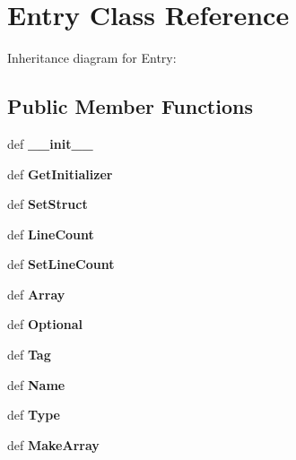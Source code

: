 \section{\-Entry \-Class \-Reference}
\label{classevent__rpcgen_1_1_entry}


\-Inheritance diagram for \-Entry\-:
\subsection*{\-Public \-Member \-Functions}
\begin{DoxyCompactItemize}
\item 
def {\bfseries \-\_\-\-\_\-init\-\_\-\-\_\-}\label{classevent__rpcgen_1_1_entry_ac775ee34451fdfa742b318538164070e}

\item 
def {\bfseries \-Get\-Initializer}\label{classevent__rpcgen_1_1_entry_acc967744885bfbdf0f0aeed27c888d23}

\item 
def {\bfseries \-Set\-Struct}\label{classevent__rpcgen_1_1_entry_af5eca523a6d4462b92da119eaf9594c0}

\item 
def {\bfseries \-Line\-Count}\label{classevent__rpcgen_1_1_entry_a97052aeb1e0121fa06a1ef4133f8ddb1}

\item 
def {\bfseries \-Set\-Line\-Count}\label{classevent__rpcgen_1_1_entry_a7b6b6235694c273d3170bc61abcd5b50}

\item 
def {\bfseries \-Array}\label{classevent__rpcgen_1_1_entry_ac12b97397419f302f99dec262035eb90}

\item 
def {\bfseries \-Optional}\label{classevent__rpcgen_1_1_entry_a4b6e95ad525d431ed4e0ca6eea4448f2}

\item 
def {\bfseries \-Tag}\label{classevent__rpcgen_1_1_entry_aaed6a1391b1f0e150e26df478cf76980}

\item 
def {\bfseries \-Name}\label{classevent__rpcgen_1_1_entry_ab6319e1c980e2e9f10435abc8cd9c076}

\item 
def {\bfseries \-Type}\label{classevent__rpcgen_1_1_entry_a16bb2b809ab79afad01e533ef200dfd2}

\item 
def {\bfseries \-Make\-Array}\label{classevent__rpcgen_1_1_entry_a89f3ba98ec7142f2ad7a94c5559f10cf}


\end{DoxyCompactItemize}
